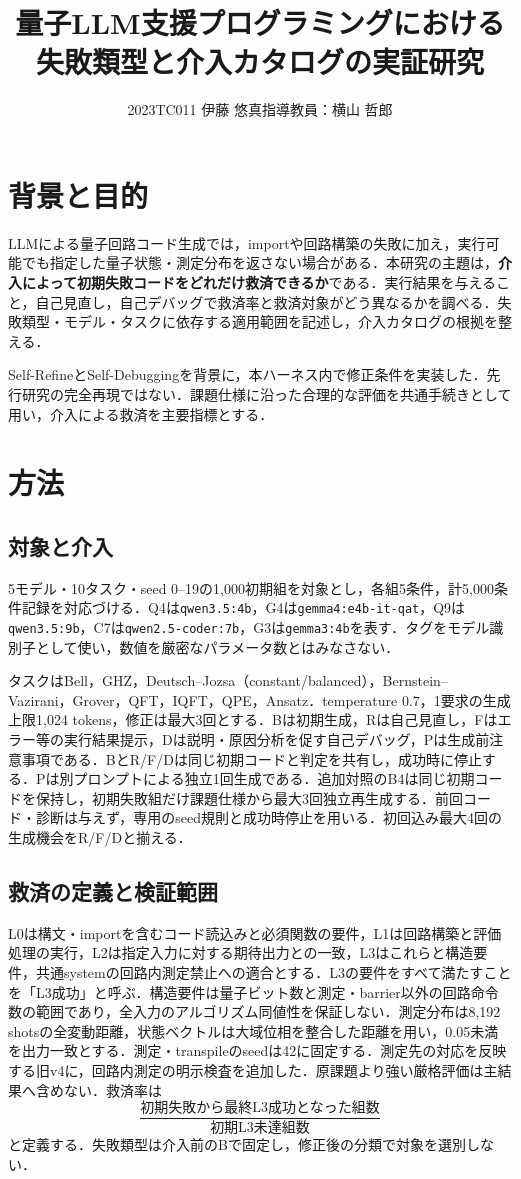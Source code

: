 \documentclass[a4paper,8pt,twocolumn]{extarticle}
\title{量子LLM支援プログラミングにおける\\失敗類型と介入カタログの実証研究}
\author{2023TC011 伊藤 悠真\quad 指導教員：横山 哲郎}
\affiliation{南山大学 理工学部 電子情報学科}
\begin{document}
\maketitle
\thispagestyle{empty}

\section{背景と目的}
LLMによる量子回路コード生成では，importや回路構築の失敗に加え，実行可能でも指定した量子状態・測定分布を返さない場合がある．本研究の主題は，\textbf{介入によって初期失敗コードをどれだけ救済できるか}である．実行結果を与えること，自己見直し，自己デバッグで救済率と救済対象がどう異なるかを調べる．失敗類型・モデル・タスクに依存する適用範囲を記述し，介入カタログの根拠を整える．

Self-Refine\cite{selfrefine}とSelf-Debugging\cite{selfdebug}を背景に，本ハーネス内で修正条件を実装した．先行研究の完全再現ではない．課題仕様に沿った合理的な評価を共通手続きとして用い，介入による救済を主要指標とする．

\section{方法}
\subsection{対象と介入}
5モデル・10タスク・seed 0--19の1,000初期組を対象とし，各組5条件，計5,000条件記録を対応づける．Q4は\texttt{qwen3.5:4b}，G4は\texttt{gemma4:e4b-it-qat}，Q9は\texttt{qwen3.5:9b}，C7は\texttt{qwen2.5-coder:7b}，G3は\texttt{gemma3:4b}を表す．タグをモデル識別子として使い，数値を厳密なパラメータ数とはみなさない．

タスクはBell，GHZ，Deutsch--Jozsa（constant/balanced），Bernstein--Vazirani，Grover，QFT，IQFT，QPE，Ansatz．temperature 0.7，1要求の生成上限1,024 tokens，修正は最大3回とする．Bは初期生成，Rは自己見直し，Fはエラー等の実行結果提示，Dは説明・原因分析を促す自己デバッグ，Pは生成前注意事項である．BとR/F/Dは同じ初期コードと判定を共有し，成功時に停止する．Pは別プロンプトによる独立1回生成である．追加対照のB4は同じ初期コードを保持し，初期失敗組だけ課題仕様から最大3回独立再生成する．前回コード・診断は与えず，専用のseed規則と成功時停止を用いる．初回込み最大4回の生成機会をR/F/Dと揃える．

\subsection{救済の定義と検証範囲}
L0は構文・importを含むコード読込みと必須関数の要件，L1は回路構築と評価処理の実行，L2は指定入力に対する期待出力との一致，L3はこれらと構造要件，共通systemの回路内測定禁止への適合とする．L3の要件をすべて満たすことを「L3成功」と呼ぶ．構造要件は量子ビット数と測定・barrier以外の回路命令数の範囲であり，全入力のアルゴリズム同値性を保証しない．測定分布は8,192 shotsの全変動距離，状態ベクトルは大域位相を整合した距離を用い，0.05未満を出力一致とする．測定・transpileのseedは42に固定する．測定先の対応を反映する旧v4に，回路内測定の明示検査を追加した．原課題より強い厳格評価は主結果へ含めない．救済率は
\[
 \frac{\text{初期失敗から最終L3成功となった組数}}{\text{初期L3未達組数}}
\]
と定義する．失敗類型は介入前のBで固定し，修正後の分類で対象を選別しない．
\end{document}
